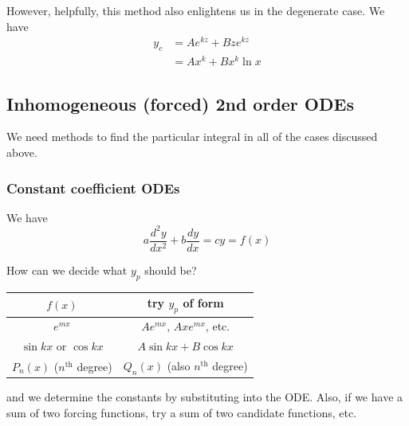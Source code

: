 \documentclass{../../template/note}
\begin{document}
    However, helpfully, this method also enlightens us in the degenerate case. We have
    \begin{align*}
        y_c &= Ae^{kz} + Bze^{kz} \\
        &= Ax^k + B x^k \ln x
    \end{align*}
    
    \subsection{Inhomogeneous (forced) 2nd order ODEs}

    We need methods to find the particular integral in all of the cases discussed above.

    \subsubsection{Constant coefficient ODEs}

    We have
    \[
        a \frac{d^2y}{dx^2} + b\frac{dy}{dx} = cy = f(x)
    \]

    How can we decide what \(y_p\) should be?

    \begin{center}
        \begin{tabular}{c c}
            \(f(x)\) & try \(y_p\) of form \\
            \hline
            \(e^{mx}\) & \(Ae^{mx}\), \(Axe^{mx}\), etc. \\
            \(\sin kx\) or \(\cos kx\) & \(A \sin kx + B \cos kx\) \\
            \(P_n(x)\) (\(n^\text{th}\) degree) & \(Q_n(x)\) (also \(n^\text{th}\) degree)
        \end{tabular}
    \end{center}
    
    and we determine the constants by substituting into the ODE. Also, if we have a sum of two forcing functions, try a sum of two candidate functions, etc.
    
\end{document}
